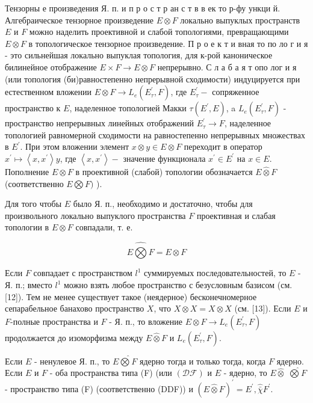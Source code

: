 \documentclass[10pt]{article}
\begin{document}
Тензорны е произведения Я. п. и п р о с т р ан с т в в ек то р-фу ункци й. Алгебраическое тензорное произведение $E \otimes F$ локально выпуклых пространств $E$ и $F$ можно наделить проективной и слабой топологиями, превращающими $E \otimes F$ в топологическое тензорное произведение. П р о е к т и вная то по ло г и я - это сильнейшая локально выпуклая топология, для к-рой каноническое билинейное отображение $E \times F \rightarrow E \otimes F$ непрерывно. С л а б а я т опо лог и я (или топология (би)равностепенно непрерывной сходимости) индуцируется при естественном вложении $E \otimes F \rightarrow L_{e}\left(E_{\tau}^{\prime}, F\right)$, где $E_{\tau}^{\prime}-$ сопряженное пространство к $E$, наделенное топологией Макки $\tau\left(E^{\prime}, E\right)$, a $L_{e}\left(E_{\tau}^{\prime}, F\right)$ - пространство непрерывных линейных отображений $E_{\tau}^{\prime} \rightarrow F$, наделенное топологией равномерной сходимости на равностепенно непрерывных множествах в $E^{\prime}$. При этом вложении элемент $x \otimes y \in E \otimes F$ переходит в оператор $x^{\prime} \longmapsto\left\langle x, x^{\prime}\right\rangle y$, где $\left\langle x, x^{\prime}\right\rangle-$ значение функционала $x^{\prime} \in E^{\prime}$ на $x \in E$. Пополнение $E \otimes F$ в проективной (слабой) топологии обозначается $E \hat{\otimes} F$ (соответственно $E \bigotimes F)$ ).



Для того чтобы $E$ было Я. п., необходимо и достаточно, чтобы для произвольного локально выпуклого пространства $F$ проективная и слабая топологии в $E \otimes F$ совпадали, т. е.



\[

E \hat{\bigotimes} F=E \otimes F

\]



Если $F$ совпадает с пространством $l^{1}$ суммируемых последовательностей, то $E$ - Я. п.; вместо $l^{1}$ можно взять любое пространство с безусловным базисом (см. [12]). Тем не менее существует такое (неядерное) бесконечномерное сепарабельное банахово пространство $X$, что $X \hat{\otimes} X=X \otimes X$ (см. [13]). Если $E$ и $F$-полные пространства и $F$ - Я. п., то вложение $E \otimes F \rightarrow L_{e}\left(E_{\tau}^{\prime}, F\right)$ продолжается до изоморфизма между $E \hat{\otimes} F$ и $L_{e}\left(E_{\tau}^{\prime}, F\right)$.



Если $E$ - ненулевое Я. п., то $E \hat{\bigotimes} F$ ядерно тогда и только тогда, когда $F$ ядерно. Если $E$ и $F$ - оба пространства типа (F) (или $(\mathscr{D F})$ и $E$ - ядерно, то $E \hat{\otimes}$ $\hat{\bigotimes} F$ - пространство типа (F) (соответственно (DDF)) и $(E \hat{\otimes} F)^{\prime}=E^{\prime}, \hat{\bar{\chi}} F^{\prime}$.
\end{document}
